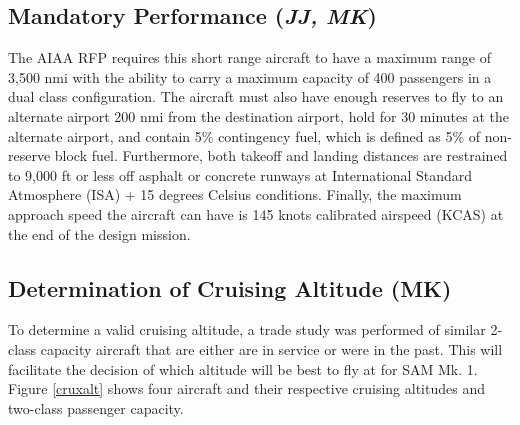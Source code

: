 \subsection{Mandatory Performance (\textit{JJ, MK})}
\label{mand}
The AIAA RFP \cite{RFP} requires this short range aircraft to have a maximum range of 3,500 nmi with the ability to carry a maximum capacity of 400 passengers in a dual class configuration. The aircraft must also have enough reserves to fly to an alternate airport 200 nmi from the destination airport, hold for 30 minutes at the alternate airport, and contain 5\% contingency fuel, which is defined as 5\% of non-reserve block fuel. Furthermore, both takeoff and landing distances are restrained to 9,000 ft or less off asphalt or concrete runways at International Standard Atmosphere (ISA) + 15 degrees Celsius conditions. Finally, the maximum approach speed the aircraft can have is 145 knots calibrated airspeed (KCAS) at the end of the design mission. 



\subsection{Determination of Cruising Altitude (\textbf{MK})}
To determine a valid cruising altitude, a trade study was performed of similar 2-class capacity aircraft that are either are in service or were in the past. This will facilitate the decision of which altitude will be best to fly at for SAM Mk. 1. Figure \ref{cruxalt} shows four aircraft and their respective cruising altitudes and two-class passenger capacity\cite{butterworth}.


